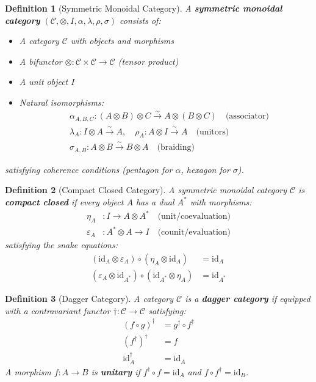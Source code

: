 \documentclass[11pt,a4paper]{article}
\newtheorem{definition}{Definition}[section]
\theoremstyle{remark}
\theoremstyle{definition}
\begin{document}
\begin{definition}[Symmetric Monoidal Category]
A \textbf{symmetric monoidal category} $(\mathcal{C}, \otimes, I, \alpha, \lambda, \rho, \sigma)$ consists of:
\begin{itemize}
\item A category $\mathcal{C}$ with objects and morphisms
\item A bifunctor $\otimes: \mathcal{C} \times \mathcal{C} \to \mathcal{C}$ (tensor product)
\item A unit object $I$
\item Natural isomorphisms:
\begin{align}
&\alpha_{A,B,C}: (A \otimes B) \otimes C \xrightarrow{\sim} A \otimes (B \otimes C) \quad \text{(associator)} \\
&\lambda_A: I \otimes A \xrightarrow{\sim} A, \quad \rho_A: A \otimes I \xrightarrow{\sim} A \quad \text{(unitors)} \\
&\sigma_{A,B}: A \otimes B \xrightarrow{\sim} B \otimes A \quad \text{(braiding)}
\end{align}
\end{itemize}
satisfying coherence conditions (pentagon for $\alpha$, hexagon for $\sigma$).
\end{definition}

\begin{definition}[Compact Closed Category]
A symmetric monoidal category $\mathcal{C}$ is \textbf{compact closed} if every object $A$ has a dual $A^*$ with morphisms:
\begin{align}
\eta_A&: I \to A \otimes A^* \quad \text{(unit/coevaluation)} \\
\varepsilon_A&: A^* \otimes A \to I \quad \text{(counit/evaluation)}
\end{align}
satisfying the snake equations:
\begin{align}
(\text{id}_A \otimes \varepsilon_A) \circ (\eta_A \otimes \text{id}_A) &= \text{id}_A \\
(\varepsilon_A \otimes \text{id}_{A^*}) \circ (\text{id}_{A^*} \otimes \eta_A) &= \text{id}_{A^*}
\end{align}
\end{definition}

\begin{definition}[Dagger Category]
A category $\mathcal{C}$ is a \textbf{dagger category} if equipped with a contravariant functor $\dagger: \mathcal{C} \to \mathcal{C}$ satisfying:
\begin{align}
(f \circ g)^\dagger &= g^\dagger \circ f^\dagger \\
(f^\dagger)^\dagger &= f \\
\text{id}_A^\dagger &= \text{id}_A
\end{align}
A morphism $f: A \to B$ is \textbf{unitary} if $f^\dagger \circ f = \text{id}_A$ and $f \circ f^\dagger = \text{id}_B$.
\end{definition}
\end{document}
